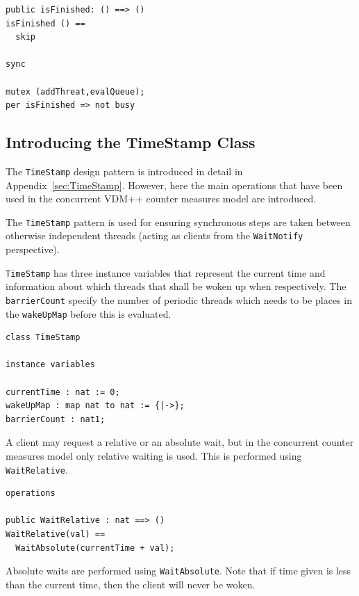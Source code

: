 \documentclass{overturerepchap}
\begin{document}
\begin{lstlisting}
public isFinished: () ==> ()
isFinished () == 
  skip

sync

mutex (addThreat,evalQueue);
per isFinished => not busy
\end{lstlisting}

\subsection{Introducing the TimeStamp Class}

The \texttt{TimeStamp} design pattern is introduced in detail in 
Appendix~\ref{sec:TimeStamp}. However, here the main operations that have
been used in the concurrent VDM++ counter measures model are introduced.

The \texttt{TimeStamp} pattern is used for ensuring synchronous steps
are taken between otherwise independent threads (acting as clients from the
\texttt{WaitNotify} perspective). 

\texttt{TimeStamp} has three instance variables that represent the current time
and information about which threads that shall be woken up when
respectively. The \texttt{barrierCount} specify the number of periodic 
threads which needs to be places in the \texttt{wakeUpMap} before this 
is evaluated.

\begin{lstlisting}
class TimeStamp

instance variables
  
currentTime : nat := 0;
wakeUpMap : map nat to nat := {|->};
barrierCount : nat1;
\end{lstlisting}

A client may request a relative or an absolute wait, but in the concurrent
counter measures model only relative waiting is used. This is
performed using \texttt{WaitRelative}.

\begin{lstlisting}
operations

public WaitRelative : nat ==> ()
WaitRelative(val) ==
  WaitAbsolute(currentTime + val);
\end{lstlisting}

Absolute waits are performed using \texttt{WaitAbsolute}. Note that if time
given is less than the current time, then the client will never be
woken.
\end{document}
